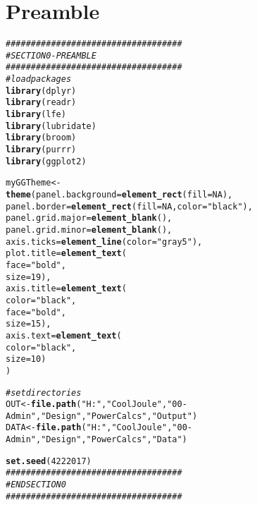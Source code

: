 \documentclass[10pt]{article}\usepackage[]{graphicx}\usepackage[]{color}
\makeatletter
\newcommand{\hlnum}[1]{\textcolor[rgb]{0.686,0.059,0.569}{#1}}%
\newcommand{\hlstr}[1]{\textcolor[rgb]{0.192,0.494,0.8}{#1}}%
\newcommand{\hlcom}[1]{\textcolor[rgb]{0.678,0.584,0.686}{\textit{#1}}}%
\newcommand{\hlstd}[1]{\textcolor[rgb]{0.345,0.345,0.345}{#1}}%
\newcommand{\hlkwb}[1]{\textcolor[rgb]{0.69,0.353,0.396}{#1}}%
\newcommand{\hlkwc}[1]{\textcolor[rgb]{0.333,0.667,0.333}{#1}}%
\newcommand{\hlkwd}[1]{\textcolor[rgb]{0.737,0.353,0.396}{\textbf{#1}}}%
\newenvironment{kframe}{%
 \def\at@end@of@kframe{}%
 \ifinner\ifhmode%
  \def\at@end@of@kframe{\end{minipage}}%
  \begin{minipage}{\columnwidth}%
 \fi\fi%
 \def\FrameCommand##1{\hskip\@totalleftmargin \hskip-\fboxsep
 \colorbox{shadecolor}{##1}\hskip-\fboxsep
     \hskip-\linewidth \hskip-\@totalleftmargin \hskip\columnwidth}%
 \MakeFramed {\advance\hsize-\width
   \@totalleftmargin\z@ \linewidth\hsize
   \@setminipage}}%
 {\par\unskip\endMakeFramed%
 \at@end@of@kframe}
\newenvironment{knitrout}{}{} %
\makeatother
\begin{document}
  \pagestyle{fancy}
    \rhead{\today}
    \addtocounter{section}{-1}
    \section{Preamble}

\begin{knitrout}
\color{fgcolor}\begin{kframe}
\begin{alltt}
\hlcom{###################################}
\hlcom{# SECTION 0 - PREAMBLE}
\hlcom{###################################}
\hlcom{# load packages}
\hlkwd{library}\hlstd{(dplyr)}
\hlkwd{library}\hlstd{(readr)}
\hlkwd{library}\hlstd{(lfe)}
\hlkwd{library}\hlstd{(lubridate)}
\hlkwd{library}\hlstd{(broom)}
\hlkwd{library}\hlstd{(purrr)}
\hlkwd{library}\hlstd{(ggplot2)}

\hlstd{myGGTheme} \hlkwb{<-}
  \hlkwd{theme}\hlstd{(}\hlkwc{panel.background} \hlstd{=} \hlkwd{element_rect}\hlstd{(}\hlkwc{fill} \hlstd{=} \hlnum{NA}\hlstd{),}
  \hlkwc{panel.border} \hlstd{=} \hlkwd{element_rect}\hlstd{(}\hlkwc{fill} \hlstd{=} \hlnum{NA}\hlstd{,} \hlkwc{color} \hlstd{=} \hlstr{"black"}\hlstd{),}
  \hlkwc{panel.grid.major} \hlstd{=} \hlkwd{element_blank}\hlstd{(),}
  \hlkwc{panel.grid.minor} \hlstd{=} \hlkwd{element_blank}\hlstd{(),}
  \hlkwc{axis.ticks} \hlstd{=} \hlkwd{element_line}\hlstd{(}\hlkwc{color} \hlstd{=} \hlstr{"gray5"}\hlstd{),}
  \hlkwc{plot.title} \hlstd{=} \hlkwd{element_text}\hlstd{(}
   \hlkwc{face}\hlstd{=}\hlstr{"bold"}\hlstd{,}
   \hlkwc{size}\hlstd{=}\hlnum{19}\hlstd{),}
  \hlkwc{axis.title} \hlstd{=} \hlkwd{element_text}\hlstd{(}
   \hlkwc{color}\hlstd{=}\hlstr{"black"}\hlstd{,}
   \hlkwc{face}\hlstd{=}\hlstr{"bold"}\hlstd{,}
   \hlkwc{size}\hlstd{=}\hlnum{15}\hlstd{),}
  \hlkwc{axis.text} \hlstd{=} \hlkwd{element_text}\hlstd{(}
   \hlkwc{color}\hlstd{=}\hlstr{"black"}\hlstd{,}
   \hlkwc{size}\hlstd{=}\hlnum{10}\hlstd{)}
\hlstd{)}

\hlcom{# set directories}
\hlstd{OUT}  \hlkwb{<-} \hlkwd{file.path}\hlstd{(}\hlstr{"H:"}\hlstd{,}\hlstr{"CoolJoule"}\hlstd{,}\hlstr{"00-Admin"}\hlstd{,}\hlstr{"Design"}\hlstd{,}\hlstr{"PowerCalcs"}\hlstd{,}\hlstr{"Output"}\hlstd{)}
\hlstd{DATA} \hlkwb{<-} \hlkwd{file.path}\hlstd{(}\hlstr{"H:"}\hlstd{,}\hlstr{"CoolJoule"}\hlstd{,}\hlstr{"00-Admin"}\hlstd{,}\hlstr{"Design"}\hlstd{,}\hlstr{"PowerCalcs"}\hlstd{,}\hlstr{"Data"}\hlstd{)}

\hlkwd{set.seed}\hlstd{(}\hlnum{4222017}\hlstd{)}
\hlcom{###################################}
\hlcom{# END SECTION 0}
\hlcom{###################################}
\end{alltt}
\end{kframe}
\end{knitrout}
\end{document}
